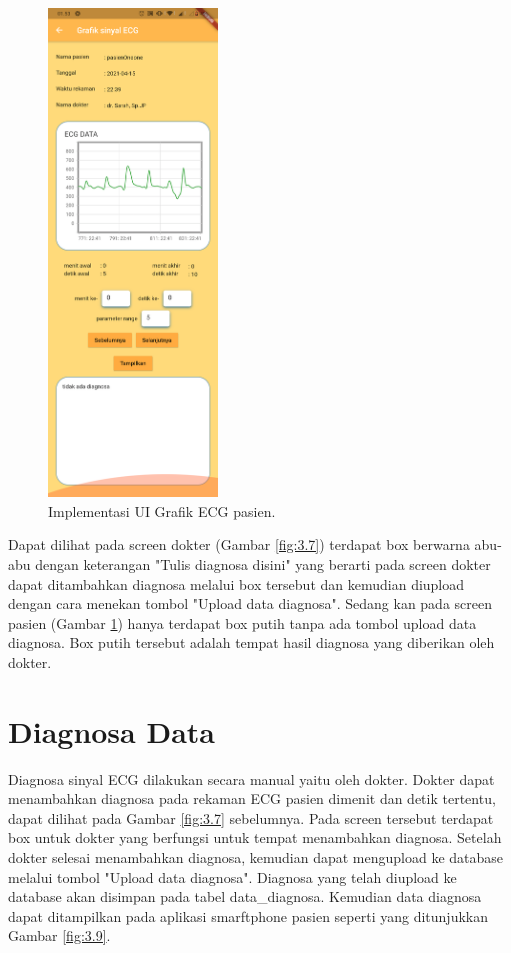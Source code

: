 \begin{figure}[H] \centering
	\includegraphics[width=0.4\textwidth]{img/layar_grafikECGpasien.png}
	\caption{Implementasi UI Grafik ECG pasien.}
	\label{fig:3.8}
\end{figure}

Dapat dilihat pada screen dokter (Gambar \ref{fig:3.7}) terdapat box berwarna abu-abu dengan keterangan "Tulis diagnosa disini" yang berarti pada screen dokter dapat ditambahkan diagnosa melalui box tersebut dan kemudian diupload dengan cara menekan tombol "Upload data diagnosa". Sedang kan pada screen pasien (Gambar \ref{fig:3.8}) hanya terdapat box putih tanpa ada tombol upload data diagnosa. Box putih tersebut adalah tempat hasil diagnosa yang diberikan oleh dokter.

\vspace{1ex} 
\section{Diagnosa Data}
\vspace{1ex}

Diagnosa sinyal ECG dilakukan secara manual yaitu oleh dokter. Dokter dapat menambahkan diagnosa pada rekaman ECG pasien dimenit dan detik tertentu, dapat dilihat pada Gambar \ref{fig:3.7} sebelumnya. Pada screen tersebut terdapat box untuk dokter yang berfungsi untuk tempat menambahkan diagnosa. Setelah dokter selesai menambahkan diagnosa, kemudian dapat mengupload ke database melalui tombol "Upload data diagnosa". Diagnosa yang telah diupload ke database akan disimpan pada tabel data\_diagnosa. Kemudian data diagnosa dapat ditampilkan pada aplikasi smarftphone pasien seperti yang ditunjukkan Gambar \ref{fig:3.9}.


